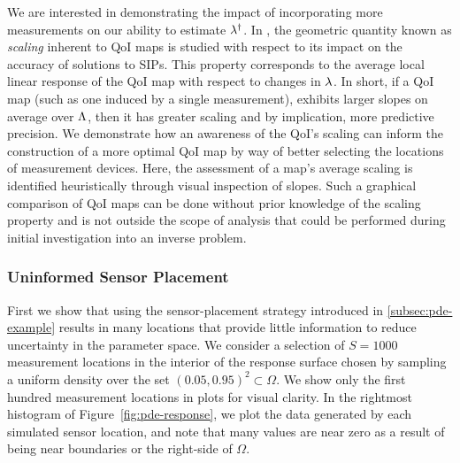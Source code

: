We are interested in demonstrating the impact of incorporating more measurements on our ability to estimate $\lambda^\dagger$.
In \cite{Walsh}, the geometric quantity known as \emph{scaling} inherent to QoI maps is studied with respect to its impact on the accuracy of solutions to SIPs.
This property corresponds to the average local linear response of the QoI map with respect to changes in $\lambda$.
In short, if a QoI map (such as one induced by a single measurement), exhibits larger slopes on average over ${\Lambda}$, then it has greater scaling and by implication, more predictive precision.
We demonstrate how an awareness of the QoI's scaling can inform the construction of a more optimal QoI map by way of better selecting the locations of measurement devices.
Here, the assessment of a map's average scaling is identified heuristically through visual inspection of slopes.
Such a graphical comparison of QoI maps can be done without prior knowledge of the scaling property and is not outside the scope of analysis that could be performed during initial investigation into an inverse problem.

\FloatBarrier
\subsubsection{Uninformed Sensor Placement}
First we show that using the sensor-placement strategy introduced in \ref{subsec:pde-example} results in many locations that provide little information to reduce uncertainty in the parameter space.
We consider a selection of $S=1000$ measurement locations in the interior of the response surface chosen by sampling a uniform density over the set $(0.05, 0.95)^2 \subset \Omega$.
We show only the first hundred measurement locations in plots for visual clarity.
In the rightmost histogram of Figure~\ref{fig:pde-response}, we plot the data generated by each simulated sensor location, and note that many values are near zero as a result of being near boundaries or the right-side of $\Omega$.


